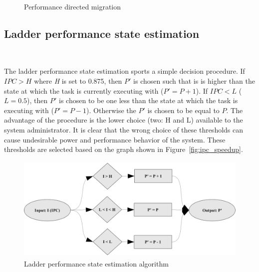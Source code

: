 \begin{figure}[h!]
  \begin{center}
    \caption{Performance directed migration}
    \label{fig:pds_migration}
  \end{center}
\end{figure}


\subsection{Ladder performance state estimation}~\label{sec:ladder}

The ladder performance state estimation sports a simple decision procedure. If $IPC > H$ 
where \textit{H} is set to 0.875, then $P'$ is chosen such that is is higher than the state
at which the task is currently executing with ($P' = P + 1$). If $IPC < L$ ($L = 0.5$), then 
$P'$ is chosen to be one less than the state at which the task is executing with ($P' = P - 1$). 
Otherwise the $P'$ is chosen to be equal to $P$. The advantage of the procedure is the lower
choice (two: H and L) available to the system administrator. It is clear that the wrong choice of these
thresholds can cause undesirable power and performance behavior of the system. These thresholds are
selected based on the graph shown in Figure~\ref{fig:ipc_speedup}. 

\begin{figure}[h!]
  \begin{center}
    \includegraphics[height=2in]{figures/Ladder_Evaluation.jpg}%
    \caption{Ladder performance state estimation algorithm}
    \label{fig:ladder_method}
  \end{center}
\end{figure}

